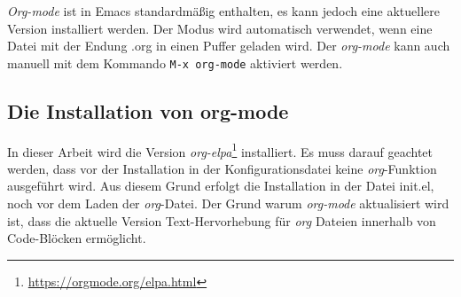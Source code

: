\textit{Org-mode} ist in Emacs standardmäßig enthalten, es kann jedoch
eine aktuellere Version installiert werden. Der Modus wird automatisch
verwendet, wenn eine Datei mit der Endung {\glqq}.org{\grqq} in einen
Puffer geladen wird. Der \textit{org-mode} kann auch manuell mit dem
Kommando \texttt{M-x org-mode} aktiviert werden.\\

\subsection{Die Installation von org-mode}
In dieser Arbeit wird die Version
\textit{org-elpa}\footnote{\url{https://orgmode.org/elpa.html}}
installiert. Es muss darauf geachtet werden, dass vor der Installation
in der Konfigurationsdatei keine \textit{org}-Funktion ausgeführt
wird. Aus diesem Grund erfolgt die Installation in der Datei
{\glqq}init.el{\grqq}, noch vor dem Laden der \textit{org}-Datei. Der
Grund warum \textit{org-mode} aktualisiert wird ist, dass die aktuelle
Version Text-Hervorhebung für \textit{org} Dateien innerhalb von
Code-Blöcken ermöglicht.\\

